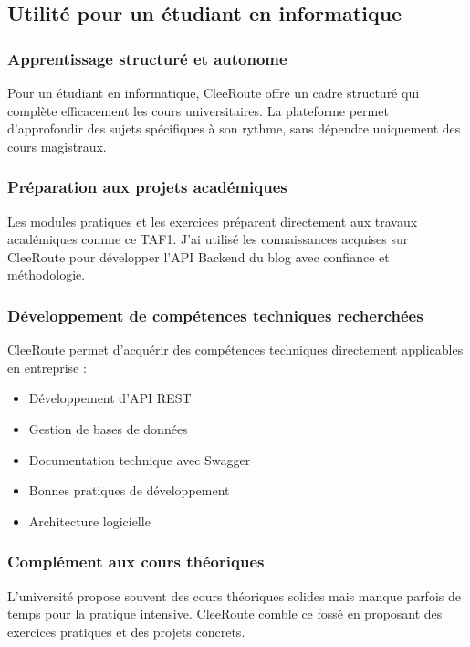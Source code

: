 \documentclass[12pt,a4paper]{article}
\begin{document}
\subsection{Utilité pour un étudiant en informatique}

\subsubsection{Apprentissage structuré et autonome}

Pour un étudiant en informatique, CleeRoute offre un cadre structuré qui complète efficacement les cours universitaires. La plateforme permet d'approfondir des sujets spécifiques à son rythme, sans dépendre uniquement des cours magistraux.

\subsubsection{Préparation aux projets académiques}

Les modules pratiques et les exercices préparent directement aux travaux académiques comme ce TAF1. J'ai utilisé les connaissances acquises sur CleeRoute pour développer l'API Backend du blog avec confiance et méthodologie.

\subsubsection{Développement de compétences techniques recherchées}

CleeRoute permet d'acquérir des compétences techniques directement applicables en entreprise :
\begin{itemize}
    \item Développement d'API REST
    \item Gestion de bases de données
    \item Documentation technique avec Swagger
    \item Bonnes pratiques de développement
    \item Architecture logicielle
\end{itemize}

\subsubsection{Complément aux cours théoriques}

L'université propose souvent des cours théoriques solides mais manque parfois de temps pour la pratique intensive. CleeRoute comble ce fossé en proposant des exercices pratiques et des projets concrets.
\end{document}
